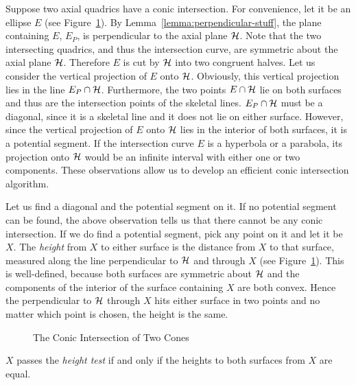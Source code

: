      Suppose two axial quadrics have a conic  intersection.  
For convenience, let it be an ellipse $E$ (see 
Figure~\ref{fig:cone-cone-example}).  
By Lemma~\ref{lemma:perpendicular-stuff}, the plane containing
$E$, $E_P$, is perpendicular to the axial plane ${\cal H}$.
Note that the two intersecting quadrics,
and thus the intersection curve, are symmetric about the axial plane 
${\cal H}$.  Therefore $E$ is cut by ${\cal H}$ into two congruent halves.
Let us consider the vertical projection of $E$ onto ${\cal H}$.  Obviously, 
this vertical projection lies in the line $E_P\cap{\cal H}$.  Furthermore,
the two points $E\cap{\cal H}$ lie on both surfaces and thus are the 
intersection points of the skeletal lines.  $E_P\cap{\cal H}$ must be a 
diagonal, since it is a skeletal line and it does not lie on either surface.
However, since the vertical projection of $E$ 
onto ${\cal H}$ lies in the interior of both surfaces,
it is a potential segment.  If the 
intersection curve $E$ is a hyperbola or a parabola, its projection onto 
${\cal H}$ would be an infinite interval with either one or two components.
These observations allow us to develop an efficient conic 
intersection algorithm.

     Let us find a diagonal and the potential segment on it.  If no potential 
segment can be found, the above observation tells us that there cannot be any 
conic intersection.  If we do find a potential segment, pick any point on it 
and let it be $X$.  The {\em height} from $X$ to either surface is the 
distance from $X$ to that surface, measured along the line perpendicular to 
${\cal H}$ and through $X$ (see Figure~\ref{fig:cone-cone-example}).  This is 
well-defined, because both surfaces are symmetric about ${\cal H}$ and the 
components of the interior of the surface containing $X$ are both convex.  
Hence the perpendicular to ${\cal H}$ through $X$ hits either surface in two 
points and no matter which point is chosen, the height is the same.  
\begin{figure}
\vspace{2.5cm}
\caption{The Conic Intersection of Two Cones}
\label{fig:cone-cone-example}
\end{figure}

\begin{definition}
     $X$ passes the {\em height test} if and only if the heights to both 
surfaces from $X$ are equal.
\end{definition}

